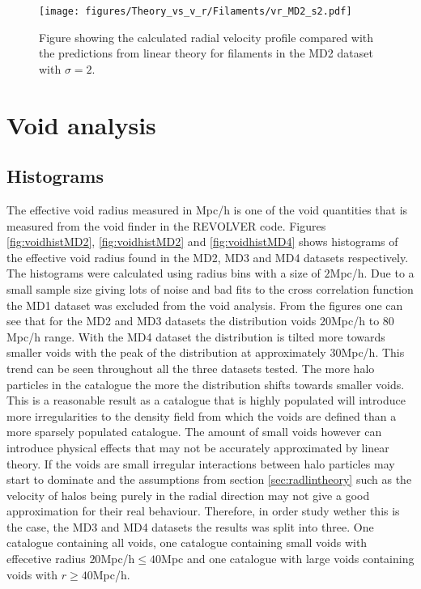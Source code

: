 \begin{figure}[H]
    \texttt{[image: figures/Theory\_vs\_v\_r/Filaments/vr\_MD2\_s2.pdf]}
    \caption{Figure showing the calculated radial velocity profile compared with the predictions from linear theory for filaments in the MD2 dataset with $\sigma=2$.}
    \label{fig:filvrMD2s2}
\end{figure}
\section{Void analysis}
\subsection{Histograms}
The effective void radius measured in Mpc/h is one of the void quantities that is measured from the void finder in the REVOLVER code. Figures \ref{fig:voidhistMD2}, \ref{fig:voidhistMD2} and \ref{fig:voidhistMD4} shows histograms of the effective void radius found in the MD2, MD3 and MD4 datasets respectively. The histograms were calculated using radius bins with a size of $2$Mpc/h. Due to a small sample size giving lots of noise and bad fits to the cross correlation function the MD1 dataset was excluded from the void analysis. From the figures one can see that for the MD2 and MD3 datasets the distribution voids $20$Mpc/h to $80$Mpc/h range. With the MD4 dataset the distribution is tilted more towards smaller voids with the peak of the distribution at approximately $30$Mpc/h. This trend can be seen throughout all the three datasets tested. The more halo particles in the catalogue the more the distribution shifts towards smaller voids. This is a reasonable result as a catalogue that is highly populated will introduce more irregularities to the density field from which the voids are defined than a more sparsely populated catalogue. The amount of small voids however can introduce physical effects that may not be accurately approximated by linear theory. If the voids are small irregular interactions between halo particles may start to dominate and the assumptions from section \ref{sec:radlintheory} such as the velocity of halos being purely in the radial direction may not give a good approximation for their real behaviour. Therefore, in order study wether this is the case, the MD3 and MD4 datasets the results was split into three. One catalogue containing all voids, one catalogue containing small voids with effecetive radius $20$Mpc/h$\leq 40$Mpc and one catalogue with large voids containing voids with $r\geq 40$Mpc/h. 

